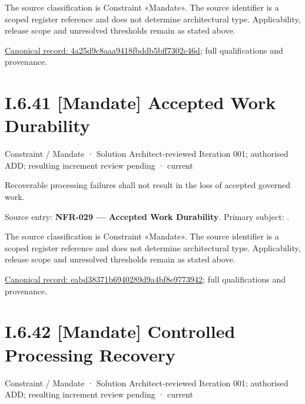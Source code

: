 The source classification is Constraint «Mandate». The source identifier is a scoped register reference and does not determine architectural type. Applicability, release scope and unresolved thresholds remain as stated above.


{\footnotesize \href{../../../../../../../../continuum/motivation/constraint/mandate/4a25d9c8aaa9418fbddb5bff7302c46d.md}{Canonical record: 4a25d9c8aaa9418fbddb5bff7302c46d}; full qualifications and provenance.}\par
\section*{I.6.41 [Mandate] Accepted Work Durability}
\label{navigation:I.6.41}

\label{element:eabd38371b6940289d9a4bf8e9773942}
{\small Constraint / Mandate · Solution Architect-reviewed Iteration 001; authorised ADD; resulting increment review pending · current}\par

Recoverable processing failures shall not result in the loss of accepted governed work.



Source entry: \textbf{NFR-029 — Accepted Work Durability}. Primary subject: \texttt{}.



The source classification is Constraint «Mandate». The source identifier is a scoped register reference and does not determine architectural type. Applicability, release scope and unresolved thresholds remain as stated above.


{\footnotesize \href{../../../../../../../../continuum/motivation/constraint/mandate/eabd38371b6940289d9a4bf8e9773942.md}{Canonical record: eabd38371b6940289d9a4bf8e9773942}; full qualifications and provenance.}\par
\section*{I.6.42 [Mandate] Controlled Processing Recovery}
\label{navigation:I.6.42}

\label{element:014a4549398d49ee81eadb7108598f48}
{\small Constraint / Mandate · Solution Architect-reviewed Iteration 001; authorised ADD; resulting increment review pending · current}\par

